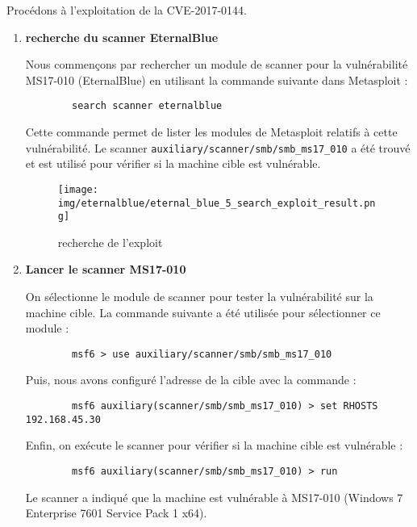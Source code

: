 \documentclass[a4paper,12pt]{report}
\begin{document}
Procédons à l'exploitation de la CVE-2017-0144.

\begin{enumerate}
    \item \textbf{recherche du scanner EternalBlue}
   
         Nous commençons par rechercher un module de scanner pour la vulnérabilité MS17-010 (EternalBlue) en utilisant la commande suivante dans Metasploit :
        \begin{lstlisting}
        search scanner eternalblue
        \end{lstlisting}
        
        Cette commande permet de lister les modules de Metasploit relatifs à cette vulnérabilité. Le scanner \texttt{auxiliary/scanner/smb/smb\_ms17\_010} a été trouvé et est utilisé pour vérifier si la machine cible est vulnérable.
        

    \begin{figure}[H] 
      \label{windows-kali-search-exploit}
        \centering
          \texttt{[image: img/eternalblue/eternal\_blue\_5\_search\_exploit\_result.png]} 
        \caption{recherche de l'exploit}
    \end{figure}

    \item \textbf{Lancer le scanner MS17-010}
    
     On sélectionne le module de scanner pour tester la vulnérabilité sur la machine cible. La commande suivante a été utilisée pour sélectionner ce module :
        \begin{lstlisting}
        msf6 > use auxiliary/scanner/smb/smb_ms17_010
        \end{lstlisting}
        
         Puis, nous avons configuré l'adresse de la cible avec la commande :
        \begin{lstlisting}
        msf6 auxiliary(scanner/smb/smb_ms17_010) > set RHOSTS 192.168.45.30
        \end{lstlisting}
        
         Enfin, on exécute le scanner pour vérifier si la machine cible est vulnérable :
        \begin{lstlisting}
        msf6 auxiliary(scanner/smb/smb_ms17_010) > run
        \end{lstlisting}
      
      Le scanner a indiqué que la machine est vulnérable à MS17-010 (Windows 7 Enterprise 7601 Service Pack 1 x64).
        

\end{enumerate}
\end{document}
